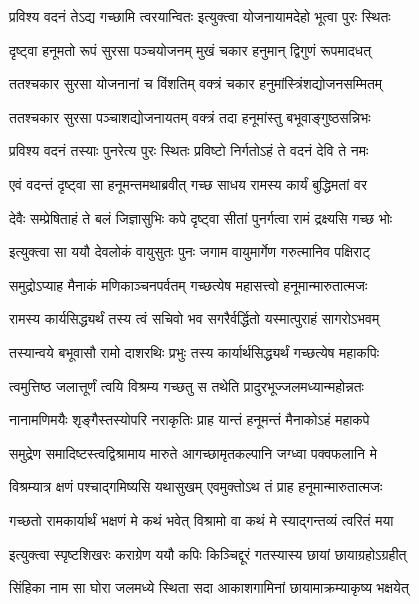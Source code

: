 \twolineshloka
{प्रविश्य वदनं तेऽद्य गच्छामि त्वरयान्वितः}
{इत्युक्त्वा योजनायामदेहो भूत्वा पुरः स्थितः} %

\twolineshloka
{दृष्ट्वा हनूमतो रूपं सुरसा पञ्चयोजनम्}
{मुखं चकार हनुमान् द्विगुणं रूपमादधत्} %

\twolineshloka
{ततश्चकार सुरसा योजनानां च विंशतिम्}
{वक्त्रं चकार हनुमांस्त्रिंशद्योजनसम्मितम्} %

\twolineshloka
{ततश्चकार सुरसा पञ्चाशद्योजनायतम्}
{वक्त्रं तदा हनूमांस्तु बभूवाङ्गुष्ठसन्निभः} %

\twolineshloka
{प्रविश्य वदनं तस्याः पुनरेत्य पुरः स्थितः}
{प्रविष्टो निर्गतोऽहं ते वदनं देवि ते नमः} %

\twolineshloka
{एवं वदन्तं दृष्ट्वा सा हनूमन्तमथाब्रवीत्}
{गच्छ साधय रामस्य कार्यं बुद्धिमतां वर} %

\twolineshloka
{देवैः सम्प्रेषिताहं ते बलं जिज्ञासुभिः कपे}
{दृष्ट्वा सीतां पुनर्गत्वा रामं द्रक्ष्यसि गच्छ भोः} %

\twolineshloka
{इत्युक्त्वा सा ययौ देवलोकं वायुसुतः पुनः}
{जगाम वायुमार्गेण गरुत्मानिव पक्षिराट्} %

\twolineshloka
{समुद्रोऽप्याह मैनाकं मणिकाञ्चनपर्वतम्}
{गच्छत्येष महासत्त्वो हनूमान्मारुतात्मजः} %

\twolineshloka
{रामस्य कार्यसिद्ध्यर्थं तस्य त्वं सचिवो भव}
{सगरैर्वर्द्धितो यस्मात्पुराहं सागरोऽभवम्} %

\twolineshloka
{तस्यान्वये बभूवासौ रामो दाशरथिः प्रभुः}
{तस्य कार्यार्थसिद्ध्यर्थं गच्छत्येष महाकपिः} %

\twolineshloka
{त्वमुत्तिष्ठ जलात्तूर्णं त्वयि विश्रम्य गच्छतु}
{स तथेति प्रादुरभूज्जलमध्यान्महोन्नतः} %

\twolineshloka
{नानामणिमयैः शृङ्गैस्तस्योपरि नराकृतिः}
{प्राह यान्तं हनूमन्तं मैनाकोऽहं महाकपे} %

\twolineshloka
{समुद्रेण समादिष्टस्त्वद्विश्रामाय मारुते}
{आगच्छामृतकल्पानि जग्ध्वा पक्वफलानि मे} %

\twolineshloka
{विश्रम्यात्र क्षणं पश्चाद्गमिष्यसि यथासुखम्}
{एवमुक्तोऽथ तं प्राह हनूमान्मारुतात्मजः} %

\twolineshloka
{गच्छतो रामकार्यार्थं भक्षणं मे कथं भवेत्}
{विश्रामो वा कथं मे स्याद्गन्तव्यं त्वरितं मया} %

\twolineshloka
{इत्युक्त्वा स्पृष्टशिखरः कराग्रेण ययौ कपिः}
{किञ्चिद्दूरं गतस्यास्य छायां छायाग्रहोऽग्रहीत्} %

\twolineshloka
{सिंहिका नाम सा घोरा जलमध्ये स्थिता सदा}
{आकाशगामिनां छायामाक्रम्याकृष्य भक्षयेत्} %

